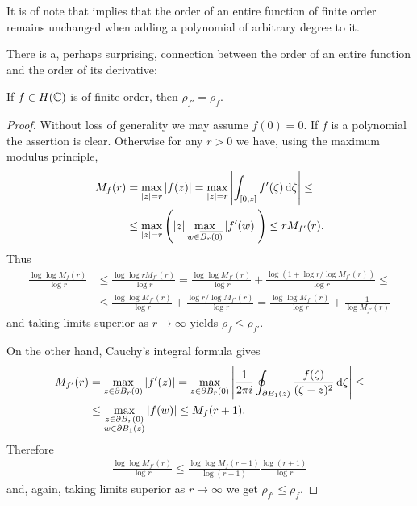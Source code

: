 It is of note that  implies that the order of an entire function of finite order remains unchanged when adding a polynomial of arbitrary degree to it.

There is a, perhaps surprising, connection between the order of an entire function and the order of its derivative:

\begin{proposition} \label{prop:order-derivative}
    If $f \in H(\mathbb{C})$ is of finite order, then $\rho_{f'} = \rho_f$.
\end{proposition}

\begin{proof}
    Without loss of generality we may assume $f(0) = 0$. If $f$ is a polynomial the assertion is clear. Otherwise for any $r > 0$ we have, using the maximum modulus principle,
    \begin{align*}
        M_f(r) &= \max_{\vert z \vert = r} \vert f(z) \vert = \max_{\vert z \vert = r} \left\vert \int_{[0, z]} f'(\zeta) \mathop{}\!\mathrm{d} \zeta \right\vert \leq \\
        &\leq \max_{\vert z \vert = r} \left( \vert z \vert \max_{w \in \overline{B_r(0)}} \vert f'(w) \vert \right) \leq r M_{f'}(r).
    \end{align*}
    Thus
    \begin{align*}
        \frac{\log \log M_f(r)}{\log r} &\leq \frac{\log \log r M_{f'}(r)}{\log r} = \frac{\log \log M_{f'}(r)}{\log r} + \frac{\log(1 + \log r / \log M_{f'}(r))}{\log r} \leq \\
        &\leq \frac{\log \log M_{f'}(r)}{\log r} + \frac{\log r / \log M_{f'}(r)}{\log r} = \frac{\log \log M_{f'}(r)}{\log r} + \frac{1}{\log M_{f'}(r)}
    \end{align*}
    and taking limits superior as $r \to \infty$ yields $\rho_f \leq \rho_{f'}$.

    On the other hand, Cauchy's integral formula gives
    \begin{align*}
        M_{f'}(r) &= \max_{z \in \partial B_r(0)} \vert f'(z) \vert = \max_{z \in \partial B_r(0)} \left\vert \frac{1}{2\pi i} \oint_{\partial B_1(z)} \frac{f(\zeta)}{(\zeta-z)^2} \mathop{}\!\mathrm{d} \zeta \right\vert \leq \\
        &\leq \max_{\substack{z \in \partial B_r(0) \\ w \in \partial B_1(z)}} \vert f(w) \vert \leq M_f(r + 1).
    \end{align*}
    Therefore
    \begin{align*}
        \frac{\log \log M_{f'}(r)}{\log r} \leq \frac{\log \log M_f(r+1)}{\log (r+1)} \frac{\log (r+1)}{\log r}
    \end{align*}
    and, again, taking limits superior as $r \to \infty$ we get $\rho_{f'} \leq \rho_f$.
\end{proof}